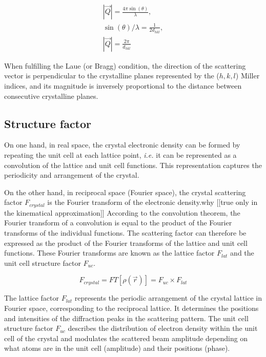 \begin{gather}
    \label{eq:QandD}
    |\vec{Q}| = \frac{4\pi \sin(\theta)}{\lambda},\\
    \sin(\theta) / \lambda = \frac{1}{2d_{hkl}},\\
    |\vec{Q}| = \frac{2\pi}{d_{hkl}}
\end{gather}{}

When fulfilling the Laue (or Bragg) condition, the direction of the scattering vector is perpendicular to the crystalline planes represented by the ($h, k, l$) Miller indices, and its magnitude is inversely proportional to the distance between consecutive crystalline planes.

\subsection{Structure factor}

On one hand, in real space, the crystal electronic density can be formed by repeating the unit cell at each lattice point, {\color{DarkOrange}\textit{i.e.}} it can be represented as a convolution of the lattice and unit cell functions.
This representation captures the periodicity and arrangement of the crystal.

On the other hand, in reciprocal space (Fourier space), the crystal scattering factor $F_{crystal}$ is the Fourier transform of the electronic density.\textcolor{Important}{why} {\color{DarkOrange}[[true only in the kinematical approximation]]}
According to the convolution theorem, the Fourier transform of a convolution is equal to the product of the Fourier transforms of the individual functions.
The scattering factor can therefore be expressed as the product of the Fourier transforms of the lattice and unit cell functions.
These Fourier transforms are known as the lattice factor $F_{lat}$ and the unit cell structure factor $F_{uc}$.

\begin{equation}
    F_{crystal} = FT[\rho(\vec{r})] = F_{uc} \times F_{lat}
    \label{eq:FcrystalFlatFuc}
\end{equation}

The lattice factor $F_{lat}$ represents the periodic arrangement of the crystal lattice in Fourier space, corresponding to the reciprocal lattice.
It determines the positions and intensities of the diffraction peaks in the scattering pattern.
The unit cell structure factor $F_{uc}$ describes the distribution of electron density within the unit cell of the crystal and modulates the scattered beam amplitude depending on what atoms are in the unit cell (amplitude) and their positions (phase).

